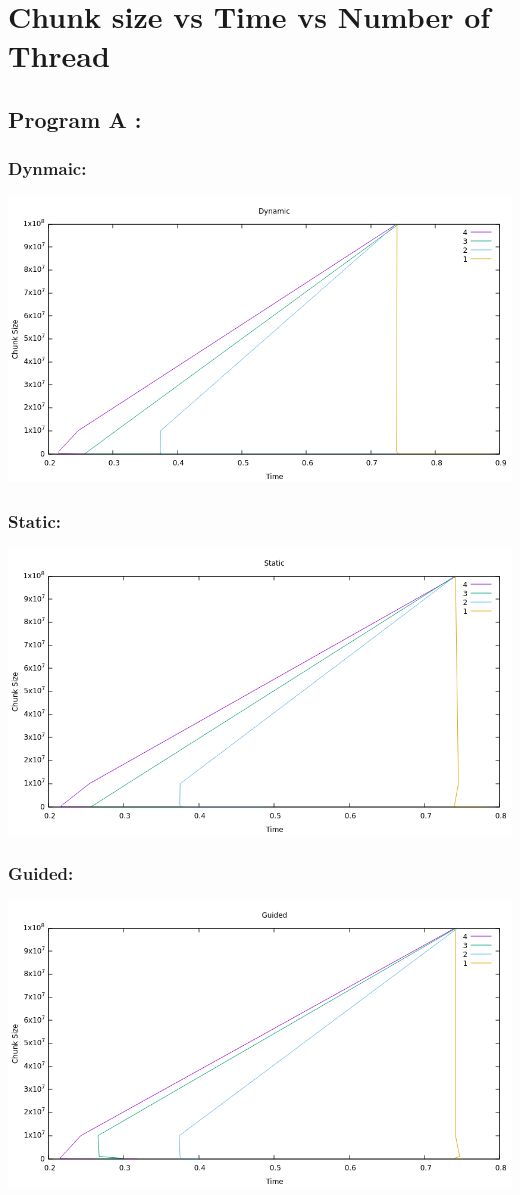 \documentclass[a4paper,10pt]{article}
\begin{document}
\section{Chunk size vs Time vs Number of Thread}
\subsection{Program A :}
\subsubsection{Dynmaic:}
\includegraphics[scale=0.65]{Dynamic}\\
\subsubsection{Static:}
\includegraphics[scale=0.65]{static}\\
\subsubsection{Guided:}
\includegraphics[scale=0.65]{guided}\\
\end{document}
